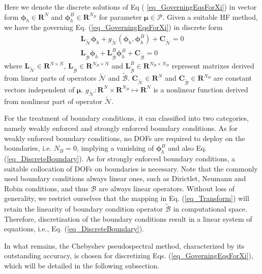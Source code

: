 \documentclass[preprint, 10pt]{elsarticle}
\begin{document}
Here we denote the discrete solutions of Eq ( \ref{eq_GoverningEqsForXi}) in vector form $\pmb{\phi} _h \in \mathbf{R}^{N  }$ and $\pmb{\phi} _h^{B} \in \mathbf{R}^{N_B}$ for parameter $\pmb{\mu}  \in \mathcal{P}$.
Given a suitable HF method, we have the governing Eq. (\ref{eq_GoverningEqsForXi}) in discrete form
\begin{align}
\mathbf{L}_{\widetilde {\mathcal{N}}}\pmb{\phi}_h +g_{\widetilde {\mathcal{N}}}(\pmb{\phi}_h, \pmb{\phi}_h^{B})
+\mathbf{C}_{\widetilde {\mathcal{N}}}
= 0
\label{eq_DiscreteEqs}
\\
\mathbf{L}_{\widetilde {\mathcal{B}}} \pmb{\phi}_h + \mathbf{L}_{\widetilde {\mathcal{B}}}^{B} \pmb{\phi}_h^{B}
+\mathbf{C}_{\widetilde {\mathcal{B}}}
= 0
\label{eq_DiscreteBoundary}
\end{align}
where $\mathbf{L}_{\widetilde {\mathcal{N}}} \in \mathbf{R}^{N \times N}$, $\mathbf{L}_{\widetilde {\mathcal{B}}} \in \mathbf{R}^{N_B \times N}$ and $\mathbf{L}_{\widetilde {\mathcal{B}}}^{B} \in \mathbf{R}^{N_B \times N_B}$ represent matrixes derived from linear parts of operators $\widetilde {\mathcal{N}}$ and $\widetilde {\mathcal{B}}$.
$\mathbf{C}_{\widetilde {\mathcal{N}}} \in \mathbf{R}^{N}$ and $\mathbf{C}_{\widetilde {\mathcal{B}}} \in \mathbf{R}^{N_B}$ are constant vectors independent of $\pmb{\mu}$.
$g_{\widetilde {\mathcal{N}}}: \mathbf{R}^N \times \mathbf{R}^{N_B} \mapsto \mathbf{R}^N$ is a nonlinear function derived from nonlinear part of operator $\widetilde {\mathcal{N}}$.

For the treatment of boundary conditions, it can classified into two categories, namely weakly enforced and strongly enforced boundary conditions.
As for weakly enforced boundary conditions, no DOFs are required to deploy on the boundaries, i.e. $N_B=0$, implying a vanishing of $\pmb{\phi} _h^{B}$ and also Eq. (\ref{eq_DiscreteBoundary}). As for strongly enforced boundary conditions, a suitable collocation of DOFs on boundaries is necessary. Note that the commonly used boundary conditions always linear ones, such as Dirictlet, Neumann and Robin conditions, and thus $\mathcal{B}$ are always linear operators. Without loss of generality, we restrict ourselves that the mapping in Eq. (\ref{eq_Transform}) will retain the linearity of boundary condition operator $\widetilde {\mathcal{B}}$ in computational space. Therefore, discretization of the boundary conditions result in a linear system of equations, i.e., Eq. (\ref{eq_DiscreteBoundary}).

In what remains, the Chebyshev pseudospectral method, characterized by its outstanding accuracy, is chosen for discretizing Eqs. (\ref{eq_GoverningEqsForXi}),  which will be detailed in the following subsection.
\end{document}
